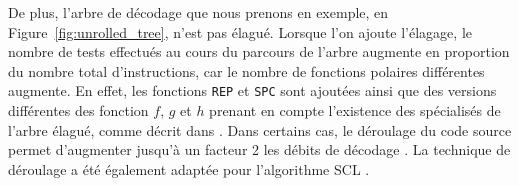 De plus, l'arbre de décodage que nous prenons en exemple, en Figure~\ref{fig:unrolled_tree}, n'est pas élagué. Lorsque l'on ajoute l'élagage, le nombre de tests effectués au cours du parcours de l'arbre augmente en proportion du nombre total d'instructions, car le nombre de fonctions polaires différentes augmente. En effet, les fonctions \texttt{REP} et \texttt{SPC} sont ajoutées ainsi que des versions différentes des fonction $f$, $g$ et $h$ prenant en compte l'existence des \noeuds spécialisés de l'arbre élagué, comme décrit dans \cite{sarkis_fast_2014,cassagne_efficient_2015}. Dans certains cas, le déroulage du code source permet d'augmenter jusqu'à un facteur 2 les débits de décodage \cite{sarkis_autogenerating_2014}. La technique de déroulage a été également adaptée pour l'algorithme SCL \cite{sarkis_fast_2016}.

